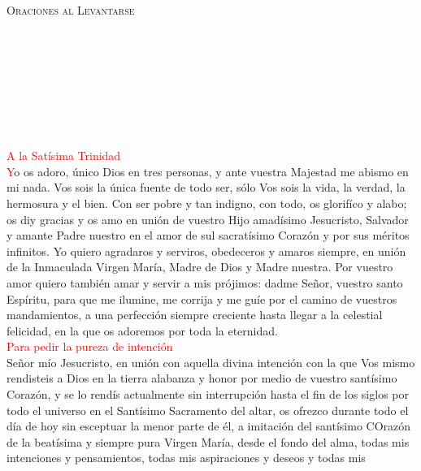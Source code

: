 \documentclass[9pt]{article}
\begin{document}
\begin{multicols}{2}

      \begin{center}
            \textsc{\Large{Oraciones al Levantarse}}
      \end{center}
      \\[1mm]
      \begin{otherlanguage}{latin}
            \\[1mm]
            \\[1mm]
            \\[1mm]
            \\[1mm]
            \\[-3mm]
      \end{otherlanguage}
      \textcolor{red}{A la Satísima Trinidad}\\
      \textcolor{red}{Y}o os adoro, único Dios en tres personas, y ante vuestra Majestad me abismo en mi nada. Vos sois la única fuente de todo ser, sólo Vos sois la vida, la verdad, la hermosura
      y el bien. Con ser pobre y tan indigno, con todo, os glorifíco y alabo; os diy gracias y os amo en unión de vuestro Hijo amadísimo Jesucristo, Salvador y amante Padre nuestro en el amor de sul
      sacratísimo Corazón y por sus méritos infinitos. Yo quiero agradaros y serviros, obedeceros y amaros siempre, en unión de la Inmaculada Virgen María, Madre de Dios y Madre nuestra.
      Por vuestro amor quiero también amar y servir a mis prójimos: dadme Señor, vuestro santo Espíritu, para que me ilumine, me corrija y me guíe por el camino de vuestros mandamientos, a una
      perfección siempre creciente hasta llegar a la celestial felicidad, en la que os adoremos por toda la eternidad.\\[1mm]
      \textcolor{red}{Para pedir la pureza de intención}\\
      Señor mío Jesucristo, en unión con aquella divina intención con la que Vos mismo rendisteis a Dios en la tierra alabanza y honor por medio de vuestro santísimo Corazón, y se lo rendís
      actualmente sin interrupción hasta el fin de los siglos por todo el universo en el Santísimo Sacramento del altar, os ofrezco durante todo el día de hoy sin esceptuar la menor parte de él,
      a imitación del santísimo COrazón de la beatísima y siempre pura Virgen María, desde el fondo del alma, todas mis intenciones y pensamientos, todas mis aspiraciones y deseos y todas mis

\end{multicols}
\end{document}
